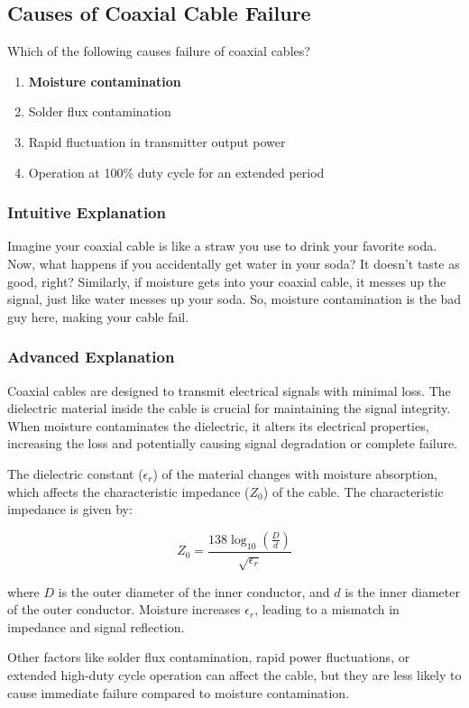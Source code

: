 \subsection{Causes of Coaxial Cable Failure}
\label{T7C09}

\begin{tcolorbox}[colback=gray!10!white,colframe=black!75!black,title=T7C09]
Which of the following causes failure of coaxial cables?
\begin{enumerate}[label=\Alph*)]
    \item \textbf{Moisture contamination}
    \item Solder flux contamination
    \item Rapid fluctuation in transmitter output power
    \item Operation at 100\% duty cycle for an extended period
\end{enumerate}
\end{tcolorbox}

\subsubsection*{Intuitive Explanation}
Imagine your coaxial cable is like a straw you use to drink your favorite soda. Now, what happens if you accidentally get water in your soda? It doesn’t taste as good, right? Similarly, if moisture gets into your coaxial cable, it messes up the signal, just like water messes up your soda. So, moisture contamination is the bad guy here, making your cable fail.

\subsubsection*{Advanced Explanation}
Coaxial cables are designed to transmit electrical signals with minimal loss. The dielectric material inside the cable is crucial for maintaining the signal integrity. When moisture contaminates the dielectric, it alters its electrical properties, increasing the loss and potentially causing signal degradation or complete failure. 

The dielectric constant (\(\epsilon_r\)) of the material changes with moisture absorption, which affects the characteristic impedance (\(Z_0\)) of the cable. The characteristic impedance is given by:

\[
Z_0 = \frac{138 \log_{10}(\frac{D}{d})}{\sqrt{\epsilon_r}}
\]

where \(D\) is the outer diameter of the inner conductor, and \(d\) is the inner diameter of the outer conductor. Moisture increases \(\epsilon_r\), leading to a mismatch in impedance and signal reflection.

Other factors like solder flux contamination, rapid power fluctuations, or extended high-duty cycle operation can affect the cable, but they are less likely to cause immediate failure compared to moisture contamination.

